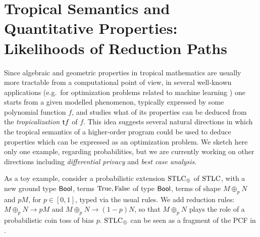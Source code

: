\documentclass[submission,%
]{eptcs}
\begin{document}
\section{Tropical Semantics and Quantitative Properties: Likelihoods of Reduction Paths}

Since algebraic and geometric properties in tropical mathematics are usually more tractable from a computational point of view, in several well-known applications (e.g.~for optimization problems related to machine learning \cite{Pachter2004, Zhang2018, Maragos2021}) one starts from a given modelled phenomenon, typically expressed by some polynomial function $f$, and studies 
what of its properties can be deduced from the \emph{tropicalization} $\mathsf{t} f$ of $f$.
This idea suggests several natural directions in which the tropical semantics of a higher-order program could be used to deduce properties which can be expressed as an optimization problem.%
We sketch here only one example, regarding probabilities, but we are currently working on other directions including \emph{differential privacy} and \emph{best case analysis}.

As a toy example, consider a probabilistic extension $\mathrm{STLC}_\oplus$ of $\mathrm{STLC}$, with a new ground type $\mathsf{Bool}$, terms $\mathrm{True},\mathrm{False}$ of type $\mathsf{Bool}$, terms of shape $M\oplus_p N$ and $pM$, for $p\in[0,1]$, typed via the usual rules.
We add reduction rules:
$M\oplus_p N \to pM$ and $M\oplus_p N \to (1-p)N$,
so that $M\oplus_p N$ plays the role of a probabilistic coin toss of bias $p$.
$\mathrm{STLC}_\oplus$ can be seen as a fragment of the PCF in \cite{Manzo2013}.
\end{document}
